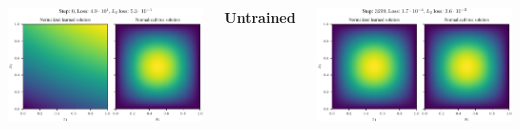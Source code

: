 \documentclass[a0paper]{tikzposter}
\begin{document}
\begin{columns}
{    \vspace{1ex}

    \begin{minipage}{0.33\linewidth}
      \centering
      \includegraphics[scale=2,trim={0.9cm 0.8cm 6.7cm 1cm}, clip]{../kfac_pinns_exp/exp42_visualize_solutions/visualize_solution/SGD/poisson_2d_sin_product_mlp-tanh-64_SGD_step0000000.pdf}

      \textbf{Untrained}
    \end{minipage}
    \hfill
    \begin{minipage}{0.33\linewidth}
      \centering
      \includegraphics[scale=2,trim={0.9cm 0.8cm 6.7cm 1cm}, clip]{../kfac_pinns_exp/exp42_visualize_solutions/visualize_solution/SGD/poisson_2d_sin_product_mlp-tanh-64_SGD_step0003299.pdf}


\end{minipage}}
\end{columns}
\end{document}
